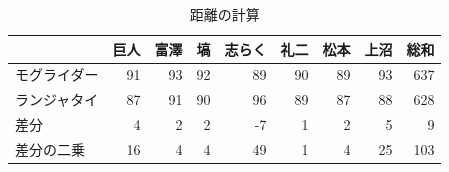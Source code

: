 \begin{table}[ht]
	\centering
	\caption{距離の計算}
	\begin{tabular}{l|rrrrrrrr}
		\hline
		       & 巨人 & 富澤 & 塙  & 志らく & 礼二 & 松本 & 上沼 & 総和  \\
		\hline
		モグライダー & 91 & 93 & 92 & 89  & 90 & 89 & 93 & 637 \\
		ランジャタイ & 87 & 91 & 90 & 96  & 89 & 87 & 88 & 628 \\
		\hline
		差分     & 4  & 2  & 2  & -7  & 1  & 2  & 5  & 9   \\
		差分の二乗  & 16 & 4  & 4  & 49  & 1  & 4  & 25 & 103 \\
		\hline
	\end{tabular}
	\label{tbl:x15_distance}
\end{table}
